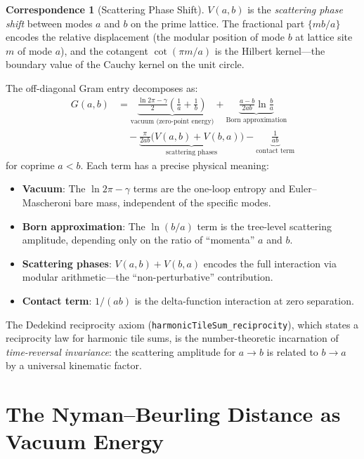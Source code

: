 \documentclass[11pt,a4paper]{article}
\theoremstyle{definition}
\newtheorem{correspondence}[definition]{Correspondence}
\newcommand{\fract}[1]{\{#1\}}
\newcommand{\lean}[1]{\texttt{#1}}
\begin{document}
\begin{correspondence}[Scattering Phase Shift]
$V(a,b)$ is the \emph{scattering phase shift} between modes
$a$ and $b$ on the prime lattice. The fractional part
$\fract{mb/a}$ encodes the relative displacement (the modular
position of mode $b$ at lattice site $m$ of mode $a$), and the
cotangent $\cot(\pi m/a)$ is the Hilbert kernel---the boundary
value of the Cauchy kernel on the unit circle.

The off-diagonal Gram entry decomposes as:
\begin{align}
  G(a,b) &= \underbrace{\frac{\ln 2\pi - \gamma}{2}\left(\frac{1}{a}+\frac{1}{b}\right)}_{\text{vacuum (zero-point energy)}}
  + \underbrace{\frac{a-b}{2ab}\ln\frac{b}{a}}_{\text{Born approximation}}
  \nonumber \\
  &\quad - \underbrace{\frac{\pi}{2ab}\bigl(V(a,b) + V(b,a)\bigr)}_{\text{scattering phases}}
  - \underbrace{\frac{1}{ab}}_{\text{contact term}}
\end{align}
for coprime $a < b$.
Each term has a precise physical meaning:
\begin{itemize}
  \item \textbf{Vacuum}: The $\ln 2\pi - \gamma$ terms are the
    one-loop entropy and Euler--Mascheroni bare mass, independent of
    the specific modes.
  \item \textbf{Born approximation}: The $\ln(b/a)$ term is the
    tree-level scattering amplitude, depending only on the ratio of
    ``momenta'' $a$ and $b$.
  \item \textbf{Scattering phases}: $V(a,b) + V(b,a)$ encodes the
    full interaction via modular arithmetic---the ``non-perturbative''
    contribution.
  \item \textbf{Contact term}: $1/(ab)$ is the delta-function
    interaction at zero separation.
\end{itemize}
\end{correspondence}

The Dedekind reciprocity axiom (\lean{harmonicTileSum\_reciprocity}),
which states a reciprocity law for harmonic tile sums, is the number-theoretic
incarnation of \emph{time-reversal invariance}: the scattering amplitude
for $a \to b$ is related to $b \to a$ by a universal kinematic factor.

\section{The Nyman--Beurling Distance as Vacuum Energy}
\label{sec:vacuum}
\end{document}
